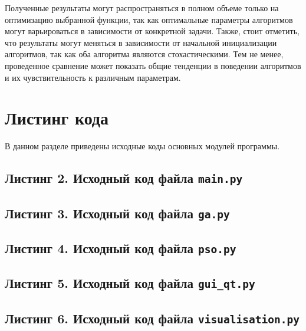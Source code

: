 \documentclass[12pt,a4paper]{article}
\begin{document}
Полученные результаты могут распространяться в полном объеме только на оптимизацию
выбранной функции, так как оптимальные параметры алгоритмов могут варьироваться в зависимости
от конкретной задачи. Также, стоит отметить, что результаты могут меняться в зависимости
от начальной инициализации алгоритмов, так как оба алгоритма являются стохастическими.
Тем не менее, проведенное сравнение может показать общие тенденции в поведении алгоритмов
и их чувствительность к различным параметрам.

\pagebreak

\section{Листинг кода}
В данном разделе приведены исходные коды основных модулей программы.

\subsection*{Листинг 2. Исходный код файла \texttt{main.py}}

\subsection*{Листинг 3. Исходный код файла \texttt{ga.py}}

\subsection*{Листинг 4. Исходный код файла \texttt{pso.py}}

\subsection*{Листинг 5. Исходный код файла \texttt{gui\_qt.py}}

\subsection*{Листинг 6. Исходный код файла \texttt{visualisation.py}}
\end{document}
